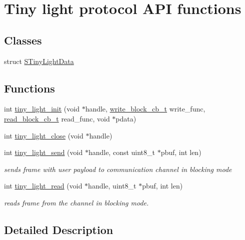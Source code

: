 \hypertarget{group__LIGHT__API}{}\section{Tiny light protocol A\+PI functions}
\label{group__LIGHT__API}
\subsection*{Classes}
\begin{DoxyCompactItemize}
\item 
struct \hyperlink{structSTinyLightData}{S\+Tiny\+Light\+Data}
\end{DoxyCompactItemize}
\subsection*{Functions}
\begin{DoxyCompactItemize}
\item 
int \hyperlink{group__LIGHT__API_ga221cf790724163d1aee89ad6a6c9a14d}{tiny\+\_\+light\+\_\+init} (void $\ast$handle, \hyperlink{tiny__proto__types_8h_aafd634660bba76cace57a8f9b01e044d}{write\+\_\+block\+\_\+cb\+\_\+t} write\+\_\+func, \hyperlink{tiny__proto__types_8h_a15bec127d9ee63658563d62e92b5261b}{read\+\_\+block\+\_\+cb\+\_\+t} read\+\_\+func, void $\ast$pdata)
\item 
int \hyperlink{group__LIGHT__API_ga6e045b8f4ef551c274fbacaa625e2748}{tiny\+\_\+light\+\_\+close} (void $\ast$handle)
\item 
int \hyperlink{group__LIGHT__API_ga12391f0d4c06fb6296b84fd4681a87f7}{tiny\+\_\+light\+\_\+send} (void $\ast$handle, const uint8\+\_\+t $\ast$pbuf, int len)
\begin{DoxyCompactList}\small\item\em sends frame with user payload to communication channel in blocking mode \end{DoxyCompactList}\item 
int \hyperlink{group__LIGHT__API_ga0181db79922917957779e1f2d740c407}{tiny\+\_\+light\+\_\+read} (void $\ast$handle, uint8\+\_\+t $\ast$pbuf, int len)
\begin{DoxyCompactList}\small\item\em reads frame from the channel in blocking mode. \end{DoxyCompactList}\end{DoxyCompactItemize}


\subsection{Detailed Description}


